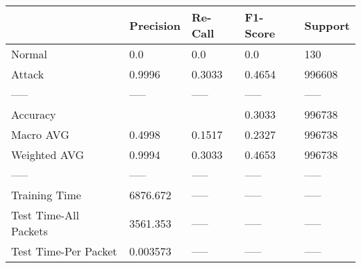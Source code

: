 \begin{tabular}{lllll}
\toprule
{} & Precision & Re-Call & F1-Score & Support \\
\midrule
Normal                &       0.0 &     0.0 &      0.0 &     130 \\
Attack                &    0.9996 &  0.3033 &   0.4654 &  996608 \\
-----                 &     ----- &   ----- &    ----- &   ----- \\
Accuracy              &           &         &   0.3033 &  996738 \\
Macro AVG             &    0.4998 &  0.1517 &   0.2327 &  996738 \\
Weighted AVG          &    0.9994 &  0.3033 &   0.4653 &  996738 \\
-----                 &     ----- &   ----- &    ----- &   ----- \\
Training Time         &  6876.672 &   ----- &    ----- &   ----- \\
Test Time-All Packets &  3561.353 &   ----- &    ----- &   ----- \\
Test Time-Per Packet  &  0.003573 &   ----- &    ----- &   ----- \\
\bottomrule
\end{tabular}
